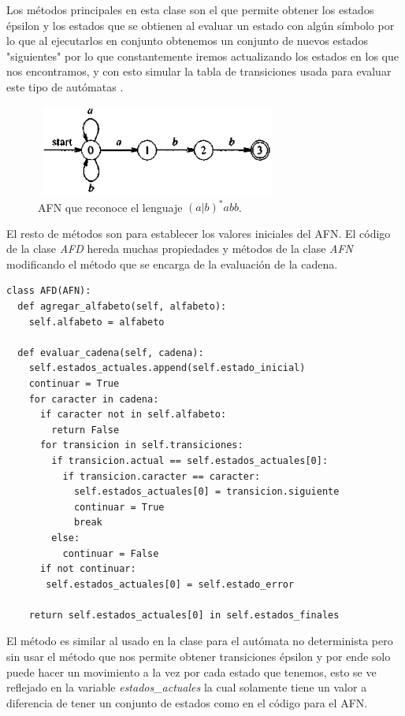 \documentclass[titlepage]{article}
\begin{document}
	Los métodos principales en esta clase son el que permite obtener los estados épsilon y los estados que se obtienen al evaluar un estado con algún símbolo por lo que al ejecutarlos en conjunto obtenemos un conjunto de nuevos estados "siguientes" por lo que constantemente iremos actualizando los estados en los que nos encontramos, y con esto simular la tabla de transiciones usada para evaluar este tipo de autómatas \cite{compis}.
	
	\begin{figure}[H]
		\begin{center}
			\includegraphics[width=8cm, height=3cm]{AFN.png}
			\caption{AFN que reconoce el lenguaje $(a|b)^{*}abb$.}
			\label{fig:AFN}
		\end{center}
	\end{figure}
	
	El resto de métodos son para establecer los valores iniciales del AFN.
	El código de la clase \emph{AFD} hereda muchas propiedades y métodos de la clase \emph{AFN} modificando el método que se encarga de la evaluación de la cadena.
	
	\begin{lstlisting}
class AFD(AFN):
  def agregar_alfabeto(self, alfabeto):
    self.alfabeto = alfabeto

  def evaluar_cadena(self, cadena):
    self.estados_actuales.append(self.estado_inicial)
    continuar = True
    for caracter in cadena:
      if caracter not in self.alfabeto:
        return False
      for transicion in self.transiciones:
        if transicion.actual == self.estados_actuales[0]:
          if transicion.caracter == caracter:
            self.estados_actuales[0] = transicion.siguiente
            continuar = True
            break
        else:
          continuar = False
      if not continuar:
       self.estados_actuales[0] = self.estado_error

    return self.estados_actuales[0] in self.estados_finales
	\end{lstlisting}
	
	El método es similar al usado en la clase para el autómata no determinista pero sin usar el método que nos permite obtener transiciones épsilon y por ende solo puede hacer un movimiento a la vez por cada estado que tenemos, esto se ve reflejado en la variable \emph{estados\_actuales} la cual solamente tiene un valor a diferencia de tener un conjunto de estados como en el código para el AFN.
	
\end{document}
